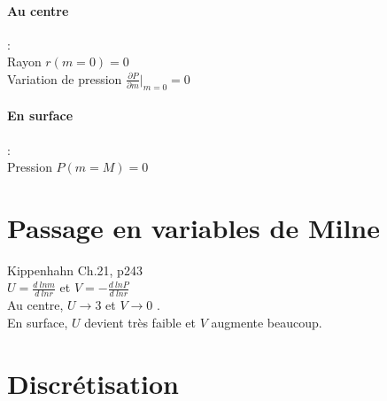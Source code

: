 \documentclass[a4paper,10pt]{article}
\begin{document}
\paragraph{Au centre}: \\
Rayon $r(m=0)=0$\\
Variation de pression $\frac{\partial P}{\partial m}\vert_{m=0} = 0$

\paragraph{En surface}: \\
Pression $P(m=M)=0$

\section{Passage en variables de Milne}
Kippenhahn Ch.21, p243\\
$U=\frac{d~ln m}{d~ln r} $ et $V=-\frac{d~ln P}{d~lnr}$\\
Au centre, $U \rightarrow 3$ et $V \rightarrow 0$ .\\
En surface, $U$ devient très faible et $V$ augmente beaucoup.

\section{Discrétisation}
%
%
\end{document}
